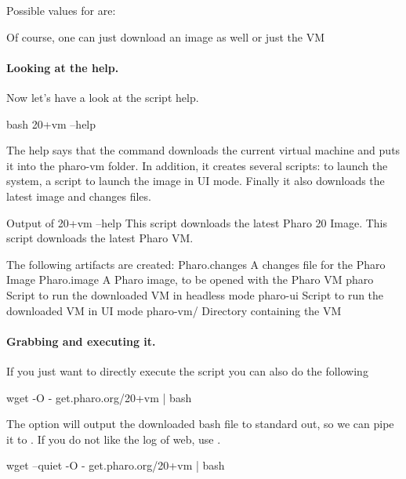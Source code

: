\documentclass[a4paper,10pt,twoside]{book}
\begin{document}
Possible values for  are: 

Of course, one can just download an image as well  or just the VM 



\paragraph{Looking at the help.}
Now let's have a look at the script help.

\begin{code}{}
bash 20+vm --help 
\end{code}

The help says that the  command downloads the current virtual machine and puts it into the pharo-vm folder. In addition, it creates several scripts:  to launch the system,  a script to launch the image in UI mode. Finally it also downloads the latest image and changes files.

\begin{code}{Output of 20+vm --help }
This script downloads the latest Pharo 20 Image.
This script downloads the latest Pharo VM.

The following artifacts are created:
    Pharo.changes  A changes file for the Pharo Image
    Pharo.image    A Pharo image, to be opened with the Pharo VM
    pharo          Script to run the downloaded VM in headless mode
    pharo-ui       Script to run the downloaded VM in UI mode
    pharo-vm/      Directory containing the VM
\end{code}



\paragraph{Grabbing and executing it.}
If you just want to directly execute the script you can also do the following

\begin{code}{}
wget -O - get.pharo.org/20+vm | bash
\end{code}

The option  will output the downloaded bash file to standard out, so we can pipe it to . If you do not like the log of web, use .

\begin{code}{}
wget --quiet -O - get.pharo.org/20+vm | bash
\end{code}
\end{document}
